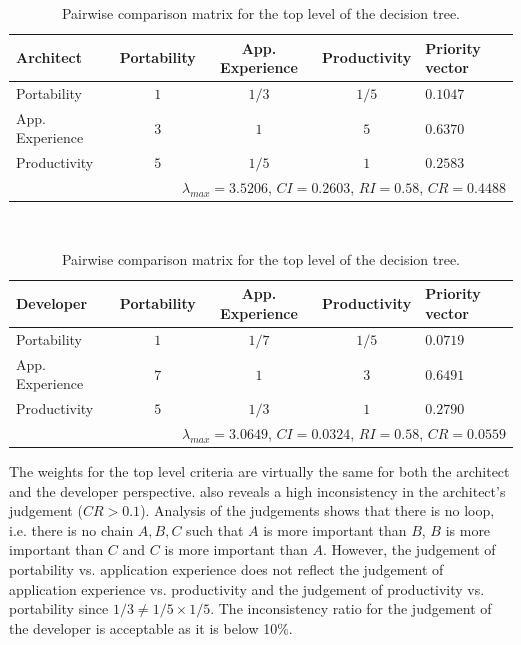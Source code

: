 \begin{table}[h!]
    \begin{center}
        \begin{tabular}{lcccl}
            \hline
            \textbf{Architect}     & Portability & App. Experience & Productivity & Priority vector \\ 
            \hline
            Portability            & $1$         & $1/3$           & $1/5$        & $0.1047$        \\
            App. Experience        & $3$         & $1$             & $5$          & $0.6370$        \\
            Productivity           & $5$         & $1/5$           & $1$          & $0.2583$        \\
            \hline
            \multicolumn{5}{r}{$\lambda_{max} = 3.5206$, $CI = 0.2603$, $RI = 0.58$, $CR = 0.4488$} \\
            \hline
        \end{tabular}
        \\\vspace{1em}
        \begin{tabular}{lcccl}
            \hline
            \textbf{Developer}     & Portability & App. Experience & Productivity & Priority vector \\ 
            \hline
            Portability            & $1$         & $1/7$           & $1/5$        & $0.0719$        \\
            App. Experience        & $7$         & $1$             & $3$          & $0.6491$        \\
            Productivity           & $5$         & $1/3$           & $1$          & $0.2790$        \\
            \hline
            \multicolumn{5}{r}{$\lambda_{max} = 3.0649$, $CI = 0.0324$, $RI = 0.58$, $CR = 0.0559$} \\
            \hline
        \end{tabular}
        \caption{Pairwise comparison matrix for the top level of the decision tree.}
        \label{tab:l1}
    \end{center}
\end{table}

The weights for the top level criteria are virtually the same for both the architect and the developer perspective.  also reveals a high inconsistency in the architect's judgement ($CR > 0.1$). Analysis of the judgements shows that there is no loop, i.e. there is no chain $A, B, C$ such that $A$ is more important than $B$, $B$ is more important than $C$ and $C$ is more important than $A$. However, the judgement of portability vs. application experience does not reflect the judgement of application experience vs. productivity and the judgement of productivity vs. portability since $1/3 \not = 1/5 \times 1/5$. The inconsistency ratio for the judgement of the developer is acceptable as it is below 10\%.

